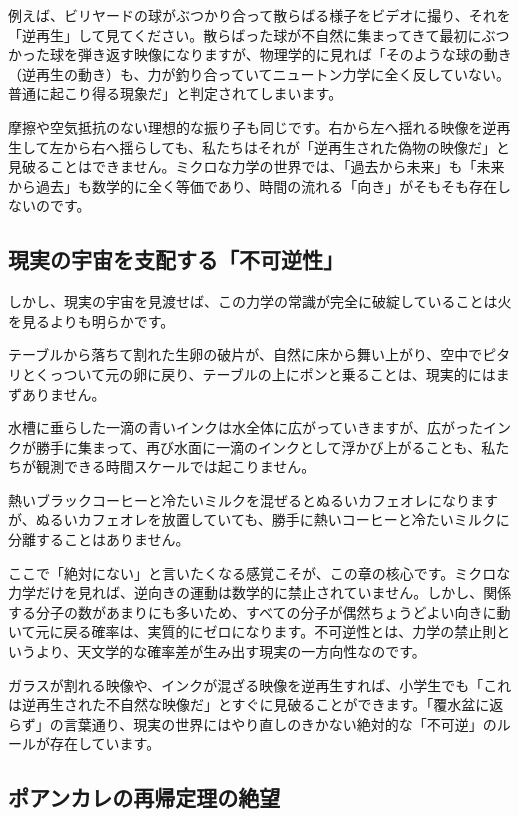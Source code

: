 例えば、ビリヤードの球がぶつかり合って散らばる様子をビデオに撮り、それを「逆再生」して見てください。散らばった球が不自然に集まってきて最初にぶつかった球を弾き返す映像になりますが、物理学的に見れば「そのような球の動き（逆再生の動き）も、力が釣り合っていてニュートン力学に全く反していない。普通に起こり得る現象だ」と判定されてしまいます。

摩擦や空気抵抗のない理想的な振り子も同じです。右から左へ揺れる映像を逆再生して左から右へ揺らしても、私たちはそれが「逆再生された偽物の映像だ」と見破ることはできません。ミクロな力学の世界では、「過去から未来」も「未来から過去」も数学的に全く等価であり、時間の流れる「向き」がそもそも存在しないのです。

\subsection{現実の宇宙を支配する「不可逆性」}

しかし、現実の宇宙を見渡せば、この力学の常識が完全に破綻していることは火を見るよりも明らかです。

テーブルから落ちて割れた生卵の破片が、自然に床から舞い上がり、空中でピタリとくっついて元の卵に戻り、テーブルの上にポンと乗ることは、現実的にはまずありません。

水槽に垂らした一滴の青いインクは水全体に広がっていきますが、広がったインクが勝手に集まって、再び水面に一滴のインクとして浮かび上がることも、私たちが観測できる時間スケールでは起こりません。

熱いブラックコーヒーと冷たいミルクを混ぜるとぬるいカフェオレになりますが、ぬるいカフェオレを放置していても、勝手に熱いコーヒーと冷たいミルクに分離することはありません。

ここで「絶対にない」と言いたくなる感覚こそが、この章の核心です。ミクロな力学だけを見れば、逆向きの運動は数学的に禁止されていません。しかし、関係する分子の数があまりにも多いため、すべての分子が偶然ちょうどよい向きに動いて元に戻る確率は、実質的にゼロになります。不可逆性とは、力学の禁止則というより、天文学的な確率差が生み出す現実の一方向性なのです。

ガラスが割れる映像や、インクが混ざる映像を逆再生すれば、小学生でも「これは逆再生された不自然な映像だ」とすぐに見破ることができます。「覆水盆に返らず」の言葉通り、現実の世界にはやり直しのきかない絶対的な「不可逆」のルールが存在しています。

\subsection{ポアンカレの再帰定理の絶望}


